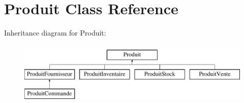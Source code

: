 \hypertarget{class_produit}{
\section{Produit Class Reference}
\label{class_produit}
}
Inheritance diagram for Produit:\begin{figure}[H]
\begin{center}
\leavevmode
\includegraphics[height=3.000000cm]{class_produit}
\end{center}
\end{figure}
